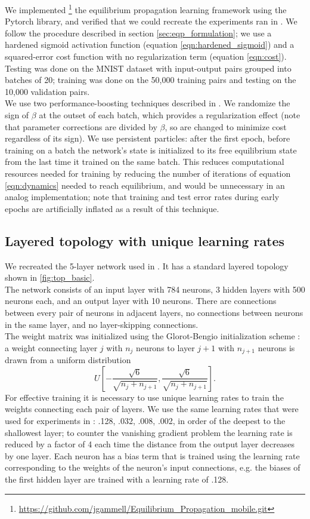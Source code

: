 \documentclass[format=sigconf]{acmart}
\newcommand{\npar}{\\\indent}
\begin{document}
We implemented
\footnote{\url{https://github.com/jgammell/Equilibrium_Propagation_mobile.git}}
 the equilibrium propagation learning framework \cite{scellier17} using the Pytorch library, and verified that we could recreate the experiments ran in \cite{scellier17}. We follow the procedure described in section \ref{sec:eqp_formulation}; we use a hardened sigmoid activation function (equation \ref{eqn:hardened_sigmoid}) and a squared-error cost function with no regularization term (equation \ref{eqn:cost}). Testing was done on the MNIST dataset \cite{mnist1998} with input-output pairs grouped into batches of 20; training was done on the 50,000 training pairs and testing on the 10,000 validation pairs.
\npar
We use two performance-boosting techniques described in \cite{scellier17}. We randomize the sign of $\beta$ at the outset of each batch, which provides a regularization effect (note that parameter corrections are divided by $\beta$, so are changed to minimize cost regardless of its sign). We use persistent particles: after the first epoch, before training on a batch the network's state is initialized to its free equilibrium state from the last time it trained on the same batch. This reduces computational resources needed for training by reducing the number of iterations of equation \ref{eqn:dynamics} needed to reach equilibrium, and would be unnecessary in an analog implementation; note that training and test error rates during early epochs are artificially inflated as a result of this technique.

\subsection{Layered topology with unique learning rates}
\label{sec:basic_topology}

We recreated the 5-layer network used in \cite{scellier17}. It has a standard layered topology shown in \ref{fig:top_basic}.
\npar
The network consists of an input layer with 784 neurons, 3 hidden layers with 500 neurons each, and an output layer with 10 neurons. There are connections between every pair of neurons in adjacent layers, no connections between neurons in the same layer, and no layer-skipping connections.
\npar
The weight matrix was initialized using the Glorot-Bengio initialization scheme \cite{glorot2010}: a weight connecting layer $j$ with $n_j$ neurons to layer $j+1$ with $n_{j+1}$ neurons is drawn from a uniform distribution
\begin{equation}
\label{eqn:gb_init}
U[-\frac{\sqrt{6}}{\sqrt{n_j+n_{j+1}}},\frac{\sqrt{6}}{\sqrt{n_j+n_{j+1}}}].
\end{equation}
For effective training it is necessary to use unique learning rates to train the weights connecting each pair of layers. We use the same learning rates that were used for experiments in \cite{scellier17}: .128, .032, .008, .002, in order of the deepest to the shallowest layer; to counter the vanishing gradient problem the learning rate is reduced by a factor of 4 each time the distance from the output layer decreases by one layer. Each neuron has a bias term that is trained using the learning rate corresponding to the weights of the neuron's input connections, e.g. the biases of the first hidden layer are trained with a learning rate of .128.
\end{document}
